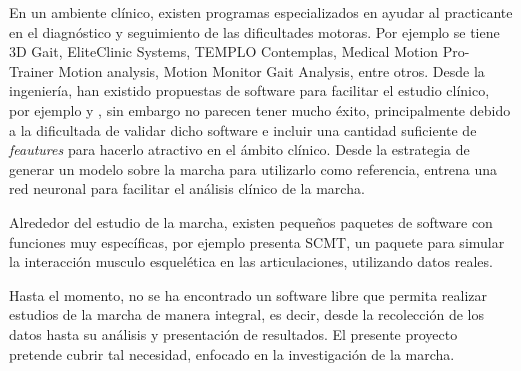 En un ambiente clínico, existen programas especializados en ayudar al practicante en el diagnóstico y seguimiento de las dificultades motoras. Por ejemplo se tiene 3D Gait, EliteClinic Systems, TEMPLO Contemplas, Medical Motion Pro-Trainer Motion analysis, Motion Monitor Gait Analysis, entre otros. Desde la ingeniería, han existido propuestas de software para facilitar el estudio clínico, por ejemplo \cite{hayla} y \cite{senanayake}, sin embargo no parecen tener mucho éxito, principalmente debido a la dificultada de validar dicho software e incluir una cantidad suficiente de \emph{feautures} para hacerlo atractivo en el ámbito clínico. Desde la estrategia de generar un modelo sobre la marcha para utilizarlo como referencia, \cite{vieira} entrena una red neuronal para facilitar el análisis clínico de la marcha.

Alrededor del estudio de la marcha, existen pequeños paquetes de software con funciones muy específicas, por ejemplo \cite{eskinazi} presenta SCMT, un paquete para simular la interacción musculo esquelética en las articulaciones, utilizando datos reales.

Hasta el momento, no se ha encontrado un software libre que permita realizar estudios de la marcha de manera integral, es decir, desde la recolección de los datos hasta su análisis y presentación de resultados. El presente proyecto pretende cubrir tal necesidad, enfocado en la investigación de la marcha.  


